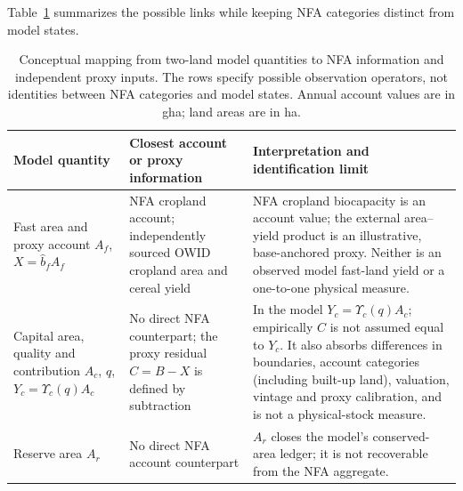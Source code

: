 \documentclass[11pt,a4paper]{article}
\newcommand{\Ups}{\Upsilon_c}
\begin{document}
Table~\ref{tab:si_model_nfa} summarizes the possible links while keeping NFA categories distinct from model states.

\begin{table}[htbp]
\centering\small
\caption{Conceptual mapping from two-land model quantities to NFA information and independent proxy inputs. The rows specify possible observation operators, not identities between NFA categories and model states. Annual account values are in gha; land areas are in ha.}
\label{tab:si_model_nfa}
\begin{tabularx}{\textwidth}{>{\raggedright\arraybackslash}p{} >{\raggedright\arraybackslash}p{} X}
\toprule
Model quantity & Closest account or proxy information & Interpretation and identification limit \\
\midrule
Fast area and proxy account $A_f$, $X=\hat b_fA_f$ & NFA cropland account; independently sourced OWID cropland area and cereal yield & NFA cropland biocapacity is an account value; the external area--yield product is an illustrative, base-anchored proxy. Neither is an observed model fast-land yield or a one-to-one physical measure. \\
Capital area, quality and contribution $A_c$, $q$, $Y_c=\Ups(q)A_c$ & No direct NFA counterpart; the proxy residual $C=B-X$ is defined by subtraction & In the model $Y_c=\Ups(q)A_c$; empirically $C$ is not assumed equal to $Y_c$. It also absorbs differences in boundaries, account categories (including built-up land), valuation, vintage and proxy calibration, and is not a physical-stock measure. \\
Reserve area $A_r$ & No direct NFA account counterpart & $A_r$ closes the model's conserved-area ledger; it is not recoverable from the NFA aggregate. \\
\bottomrule
\end{tabularx}
\end{table}
\end{document}
